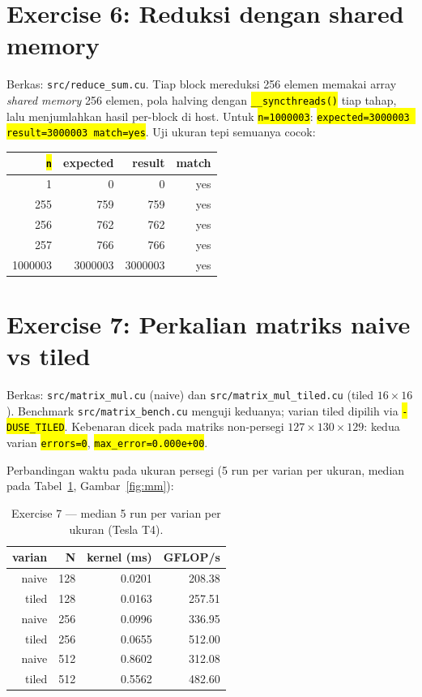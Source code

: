 \documentclass[11pt,a4paper]{article}
\newcommand{\cmd}[1]{\hl{\texttt{#1}}}
\begin{document}
\section{Exercise 6: Reduksi dengan shared memory}
Berkas: \texttt{src/reduce\_sum.cu}. Tiap block mereduksi 256 elemen memakai array \emph{shared memory} 256 elemen, pola halving dengan \cmd{\_\_syncthreads()} tiap tahap, lalu menjumlahkan hasil per-block di host. Untuk \cmd{n=1000003}: \cmd{expected=3000003 result=3000003 match=yes}. Uji ukuran tepi semuanya cocok:

\begin{center}
\begin{tabular}{rrrr}
\toprule
\cmd{n} & expected & result & match\\
\midrule
1 & 0 & 0 & yes\\
255 & 759 & 759 & yes\\
256 & 762 & 762 & yes\\
257 & 766 & 766 & yes\\
1000003 & 3000003 & 3000003 & yes\\
\bottomrule
\end{tabular}
\end{center}

\section{Exercise 7: Perkalian matriks naive vs tiled}
Berkas: \texttt{src/matrix\_mul.cu} (naive) dan \texttt{src/matrix\_mul\_tiled.cu} (tiled $16\times16$). Benchmark \texttt{src/matrix\_bench.cu} menguji keduanya; varian tiled dipilih via \cmd{-DUSE\_TILED}. Kebenaran dicek pada matriks non-persegi $127 \times 130 \times 129$: kedua varian \cmd{errors=0}, \cmd{max\_error=0.000e+00}.

Perbandingan waktu pada ukuran persegi (5 run per varian per ukuran, median pada Tabel~\ref{tab:ex7}, Gambar~\ref{fig:mm}):

\begin{table}[H]\centering
\caption{Exercise 7 --- median 5 run per varian per ukuran (Tesla T4).}
\label{tab:ex7}
\begin{tabular}{rrrr}
\toprule
varian & N & kernel (ms) & GFLOP/s\\
\midrule
naive & 128 & 0.0201 & 208.38\\
tiled & 128 & 0.0163 & 257.51\\
naive & 256 & 0.0996 & 336.95\\
tiled & 256 & 0.0655 & 512.00\\
naive & 512 & 0.8602 & 312.08\\
tiled & 512 & 0.5562 & 482.60\\
\bottomrule
\end{tabular}
\end{table}
\end{document}
